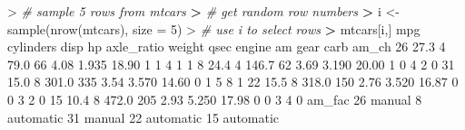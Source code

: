 \documentclass[
]{book}
\newenvironment{Shaded}{\begin{snugshade}}{\end{snugshade}}
\newcommand{\AttributeTok}[1]{\textcolor[rgb]{0.77,0.63,0.00}{#1}}
\newcommand{\CommentTok}[1]{\textcolor[rgb]{0.56,0.35,0.01}{\textit{#1}}}
\newcommand{\DecValTok}[1]{\textcolor[rgb]{0.00,0.00,0.81}{#1}}
\newcommand{\ErrorTok}[1]{\textcolor[rgb]{0.64,0.00,0.00}{\textbf{#1}}}
\newcommand{\FloatTok}[1]{\textcolor[rgb]{0.00,0.00,0.81}{#1}}
\newcommand{\FunctionTok}[1]{\textcolor[rgb]{0.00,0.00,0.00}{#1}}
\newcommand{\NormalTok}[1]{#1}
\newcommand{\OtherTok}[1]{\textcolor[rgb]{0.56,0.35,0.01}{#1}}
\newcommand{\SpecialCharTok}[1]{\textcolor[rgb]{0.00,0.00,0.00}{#1}}
\begin{document}
\begin{Shaded}
\begin{Highlighting}[]
\SpecialCharTok{\textgreater{}} \CommentTok{\# sample 5 rows from mtcars}
\ErrorTok{\textgreater{}} \CommentTok{\# get random row numbers}
\ErrorTok{\textgreater{}}\NormalTok{ i }\OtherTok{\textless{}{-}} \FunctionTok{sample}\NormalTok{(}\FunctionTok{nrow}\NormalTok{(mtcars), }\AttributeTok{size =} \DecValTok{5}\NormalTok{)}
\SpecialCharTok{\textgreater{}} \CommentTok{\# use i to select rows}
\ErrorTok{\textgreater{}}\NormalTok{ mtcars[i,]}
\NormalTok{    mpg cylinders  disp  hp axle\_ratio weight  qsec engine am gear carb am\_ch}
\DecValTok{26} \FloatTok{27.3}         \DecValTok{4}  \FloatTok{79.0}  \DecValTok{66}       \FloatTok{4.08}  \FloatTok{1.935} \FloatTok{18.90}      \DecValTok{1}  \DecValTok{1}    \DecValTok{4}    \DecValTok{1}     \DecValTok{1}
\DecValTok{8}  \FloatTok{24.4}         \DecValTok{4} \FloatTok{146.7}  \DecValTok{62}       \FloatTok{3.69}  \FloatTok{3.190} \FloatTok{20.00}      \DecValTok{1}  \DecValTok{0}    \DecValTok{4}    \DecValTok{2}     \DecValTok{0}
\DecValTok{31} \FloatTok{15.0}         \DecValTok{8} \FloatTok{301.0} \DecValTok{335}       \FloatTok{3.54}  \FloatTok{3.570} \FloatTok{14.60}      \DecValTok{0}  \DecValTok{1}    \DecValTok{5}    \DecValTok{8}     \DecValTok{1}
\DecValTok{22} \FloatTok{15.5}         \DecValTok{8} \FloatTok{318.0} \DecValTok{150}       \FloatTok{2.76}  \FloatTok{3.520} \FloatTok{16.87}      \DecValTok{0}  \DecValTok{0}    \DecValTok{3}    \DecValTok{2}     \DecValTok{0}
\DecValTok{15} \FloatTok{10.4}         \DecValTok{8} \FloatTok{472.0} \DecValTok{205}       \FloatTok{2.93}  \FloatTok{5.250} \FloatTok{17.98}      \DecValTok{0}  \DecValTok{0}    \DecValTok{3}    \DecValTok{4}     \DecValTok{0}
\NormalTok{      am\_fac}
\DecValTok{26}\NormalTok{    manual}
\DecValTok{8}\NormalTok{  automatic}
\DecValTok{31}\NormalTok{    manual}
\DecValTok{22}\NormalTok{ automatic}
\DecValTok{15}\NormalTok{ automatic}
\end{Highlighting}
\end{Shaded}
\end{document}
